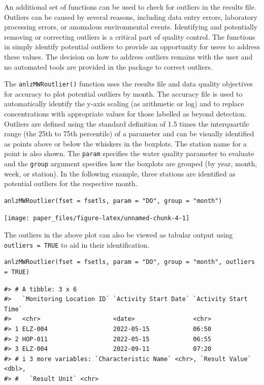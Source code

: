 An additional set of functions can be used to check for outliers in the results file. Outliers can be caused by several reasons, including data entry errors, laboratory processing errors, or anomalous environmental events. Identifying and potentially removing or correcting outliers is a critical part of quality control. The functions in  simply identify potential outliers to provide an opportunity for users to address these values. The decision on how to address outliers remains with the user and no automated tools are provided in the package to correct outliers.

The \texttt{anlzMWRoutlier()} function uses the results file and data quality objectives for accuracy to plot potential outliers by month. The accuracy file is used to automatically identify the y-axis scaling (as arithmetic or log) and to replace concentrations with appropriate values for those labelled as beyond detection. Outliers are defined using the standard definition of 1.5 times the interquartile range (the 25th to 75th percentile) of a parameter and can be visually identified as points above or below the whiskers in the boxplots. The station name for a point is also shown. The \texttt{param} specifies the water quality parameter to evaluate and the \texttt{group} argument specifies how the boxplots are grouped (by year, month, week, or station). In the following example, three stations are identified as potential outliers for the respective month.

\begin{verbatim}
anlzMWRoutlier(fset = fsetls, param = "DO", group = "month")
\end{verbatim}

\texttt{[image: paper\_files/figure-latex/unnamed-chunk-4-1]}

The outliers in the above plot can also be viewed as tabular output using \texttt{outliers\ =\ TRUE} to aid in their identification.

\begin{verbatim}
anlzMWRoutlier(fset = fsetls, param = "DO", group = "month", outliers = TRUE)
\end{verbatim}

\begin{verbatim}
#> # A tibble: 3 x 6
#>   `Monitoring Location ID` `Activity Start Date` `Activity Start Time`
#>   <chr>                    <date>                <chr>                
#> 1 ELZ-004                  2022-05-15            06:50                
#> 2 HOP-011                  2022-05-15            06:55                
#> 3 ELZ-004                  2022-09-11            07:20                
#> # i 3 more variables: `Characteristic Name` <chr>, `Result Value` <dbl>,
#> #   `Result Unit` <chr>
\end{verbatim}

